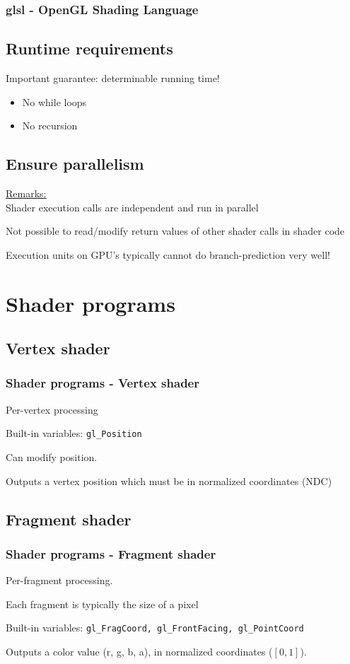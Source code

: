 \documentclass{beamer}
\begin{document}
%
%
%
\begin{frame}
\frametitle{glsl - OpenGL Shading Language}

\subsection{Runtime requirements}
Important guarantee: determinable running time!

\begin{itemize}
\item No while loops
\item No recursion
\end{itemize}

\subsection{Ensure parallelism}
\underline{Remarks:}\\\vspace{1mm}
Shader execution calls are independent and run in parallel

Not possible to read/modify return values of other shader calls in shader code

Execution units on GPU's typically cannot do branch-prediction very well!
\end{frame}


%
%
%
\section{Shader programs}

\subsection{Vertex shader}
\begin{frame}
\frametitle{Shader programs - Vertex shader}

Per-vertex processing

Built-in variables: \texttt{gl\_Position}

Can modify position.

Outputs a vertex position which must be in normalized coordinates (NDC)
\end{frame}


%
%
%
\subsection{Fragment shader}
\begin{frame}
\frametitle{Shader programs - Fragment shader}
Per-fragment processing.

Each fragment is typically the size of a pixel

Built-in variables: \texttt{gl\_FragCoord, gl\_FrontFacing, gl\_PointCoord}

Outputs a color value (r, g, b, a), in normalized coordinates ($[0, 1]$).

\end{frame}
\end{document}
